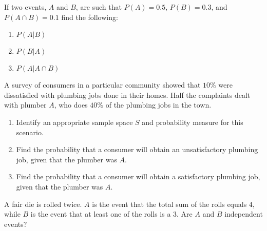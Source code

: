 \documentclass[12pt,reqno]{amsart}
\begin{document}
\prob If two events, $A$ and $B$, are such that $P(A)=0.5$, $P(B)=0.3$, and $P(A\cap B)=0.1$ find the following:

\medskip
\begin{enumerate}
    \item $P(A|B)$\vfill
    \item $P(B|A)$\vfill
    \item $P(A |A\cap B)$\vfill
\end{enumerate}









\newpage
\prob A survey of consumers in a particular community showed that $10\%$ were dissatisfied with plumbing jobs done in their homes. Half the complaints dealt with plumber $A$, who does $40\%$ of the plumbing jobs in the town.

\medskip
\begin{enumerate}
    \item Identify an appropriate sample space $S$ and probability measure for this scenario.\vfill
    
    

    \item Find the probability that a consumer will obtain an unsatisfactory plumbing job, given that the plumber was $A$.\vfill
    
    

    \item Find the probability that a consumer will obtain a satisfactory plumbing job, given that the plumber was $A$.\vfill
    

\end{enumerate}














\bigskip
\prob A fair die is rolled twice. $A$ is the event that the total sum of the rolls equals $4$, while $B$ is the event that at least one of the rolls is a 3. Are $A$ and $B$ independent events?\vfill
\end{document}
